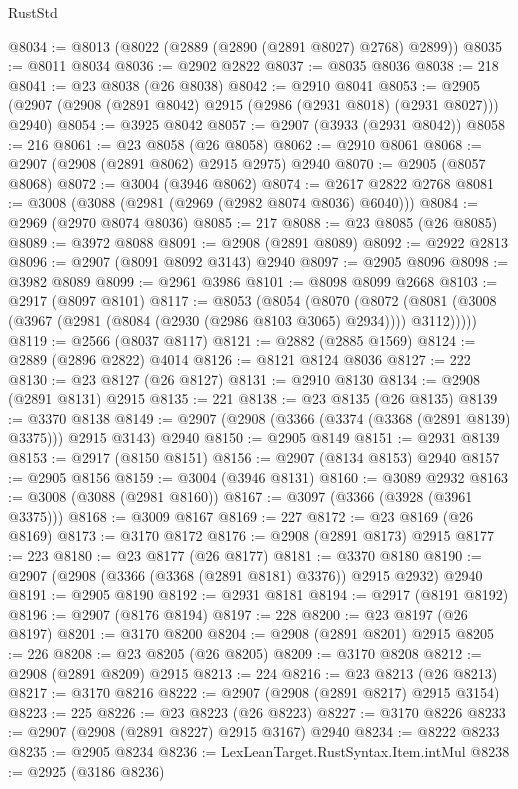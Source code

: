 \begin{lexlean}{RustStd}
\begin{coremodule}
@8034 := @8013 (@8022 (@2889 (@2890 (@2891 @8027) @2768) @2899))
@8035 := @8011 @8034
@8036 := @2902 @2822
@8037 := @8035 @8036
@8038 := 218
@8041 := @23 @8038 (@26 @8038)
@8042 := @2910 @8041
@8053 := @2905 (@2907 (@2908 (@2891 @8042) @2915 (@2986 (@2931 @8018) (@2931 @8027))) @2940)
@8054 := @3925 @8042
@8057 := @2907 (@3933 (@2931 @8042))
@8058 := 216
@8061 := @23 @8058 (@26 @8058)
@8062 := @2910 @8061
@8068 := @2907 (@2908 (@2891 @8062) @2915 @2975) @2940
@8070 := @2905 (@8057 @8068)
@8072 := @3004 (@3946 @8062)
@8074 := @2617 @2822 @2768
@8081 := @3008 (@3088 (@2981 (@2969 (@2982 @8074 @8036) @6040)))
@8084 := @2969 (@2970 @8074 @8036)
@8085 := 217
@8088 := @23 @8085 (@26 @8085)
@8089 := @3972 @8088
@8091 := @2908 (@2891 @8089)
@8092 := @2922 @2813
@8096 := @2907 (@8091 @8092 @3143) @2940
@8097 := @2905 @8096
@8098 := @3982 @8089
@8099 := @2961 @3986
@8101 := @8098 @8099 @2668
@8103 := @2917 (@8097 @8101)
@8117 := @8053
    (@8054
      (@8070
        (@8072 (@8081 (@3008 (@3967 (@2981 (@8084 (@2930 (@2986 @8103 @3065) @2934)))) @3112)))))
@8119 := @2566 (@8037 @8117)
@8121 := @2882 (@2885 @1569)
@8124 := @2889 (@2896 @2822) @4014
@8126 := @8121 @8124 @8036
@8127 := 222
@8130 := @23 @8127 (@26 @8127)
@8131 := @2910 @8130
@8134 := @2908 (@2891 @8131) @2915
@8135 := 221
@8138 := @23 @8135 (@26 @8135)
@8139 := @3370 @8138
@8149 := @2907 (@2908 (@3366 (@3374 (@3368 (@2891 @8139) @3375))) @2915 @3143) @2940
@8150 := @2905 @8149
@8151 := @2931 @8139
@8153 := @2917 (@8150 @8151)
@8156 := @2907 (@8134 @8153) @2940
@8157 := @2905 @8156
@8159 := @3004 (@3946 @8131)
@8160 := @3089 @2932
@8163 := @3008 (@3088 (@2981 @8160))
@8167 := @3097 (@3366 (@3928 (@3961 @3375)))
@8168 := @3009 @8167
@8169 := 227
@8172 := @23 @8169 (@26 @8169)
@8173 := @3170 @8172
@8176 := @2908 (@2891 @8173) @2915
@8177 := 223
@8180 := @23 @8177 (@26 @8177)
@8181 := @3370 @8180
@8190 := @2907 (@2908 (@3366 (@3368 (@2891 @8181) @3376)) @2915 @2932) @2940
@8191 := @2905 @8190
@8192 := @2931 @8181
@8194 := @2917 (@8191 @8192)
@8196 := @2907 (@8176 @8194)
@8197 := 228
@8200 := @23 @8197 (@26 @8197)
@8201 := @3170 @8200
@8204 := @2908 (@2891 @8201) @2915
@8205 := 226
@8208 := @23 @8205 (@26 @8205)
@8209 := @3170 @8208
@8212 := @2908 (@2891 @8209) @2915
@8213 := 224
@8216 := @23 @8213 (@26 @8213)
@8217 := @3170 @8216
@8222 := @2907 (@2908 (@2891 @8217) @2915 @3154)
@8223 := 225
@8226 := @23 @8223 (@26 @8223)
@8227 := @3170 @8226
@8233 := @2907 (@2908 (@2891 @8227) @2915 @3167) @2940
@8234 := @8222 @8233
@8235 := @2905 @8234
@8236 := LexLeanTarget.RustSyntax.Item.intMul
@8238 := @2925 (@3186 @8236)

\end{coremodule}
\end{lexlean}
